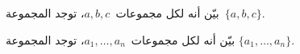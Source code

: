 \documentclass[../../../include/open-logic-section]{subfiles}
\begin{document}
\begin{prob}
بيّن أنه لكل مجموعات~$a,b,c$، توجد المجموعة~$\{a,b,c\}$.
\end{prob}

\begin{prob}
بيّن أنه لكل مجموعات~$a_1,\ldots,a_n$، توجد المجموعة
$\{a_1,\ldots,a_n\}$.
\end{prob}

\end{document}

